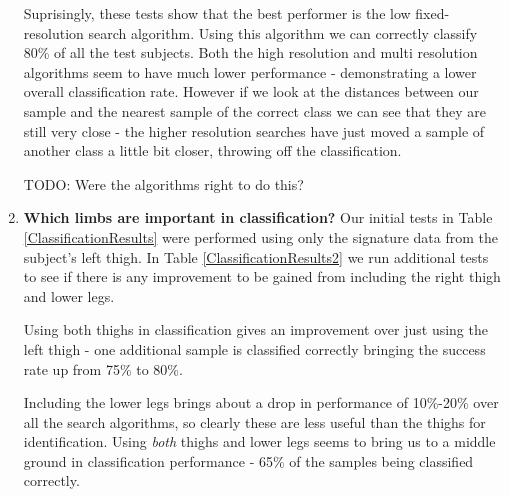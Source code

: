 \begin{enumerate}
		Suprisingly, these tests show that the best performer is the low fixed-resolution search algorithm.
		Using this algorithm we can correctly classify 80\% of all the test subjects.
		Both the high resolution and multi resolution algorithms seem to have much lower performance - demonstrating a lower overall classification rate.
		However if we look at the distances between our sample and the nearest sample of the correct class we can see that they are still very close - the higher resolution searches
		have just moved a sample of another class a little bit closer, throwing off the classification.
		
		TODO: Were the algorithms right to do this?
		
	\item \textbf{Which limbs are important in classification?}
		Our initial tests in Table \ref{ClassificationResults} were performed using only the signature data from the subject's left thigh.
		In Table \ref{ClassificationResults2} we run additional tests to see if there is any improvement to be gained from including the right thigh and lower legs.
		
		Using both thighs in classification gives an improvement over just using the left thigh - one additional sample is classified correctly bringing the success rate up from 75\% to 80\%.
		
		Including the lower legs brings about a drop in performance of 10\%-20\% over all the search algorithms, so clearly these are less useful than the thighs for identification.
		Using \emph{both} thighs and lower legs seems to bring us to a middle ground in classification performance - 65\% of the samples being classified correctly.
\end{enumerate}

